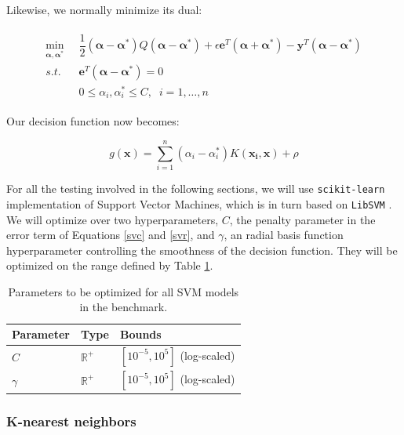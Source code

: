 \documentclass[10pt,a4paper,twoside]{book}
\begin{document}
Likewise, we normally minimize its dual:

\begin{align}\label{svr}
\begin{split}
\min_{\boldsymbol{\alpha}, \boldsymbol{\alpha}^*}\;\;& \dfrac{1}{2}(\boldsymbol{\alpha} - \boldsymbol{\alpha}^*) Q(\boldsymbol{\alpha} - \boldsymbol{\alpha}^*) + \epsilon \boldsymbol{e}^T(\boldsymbol{\alpha} + \boldsymbol{\alpha}^*) - \boldsymbol{y}^T(\boldsymbol{\alpha} - \boldsymbol{\alpha}^*)\\
s.t. \;\; & \boldsymbol{e}^T(\boldsymbol{\alpha} - \boldsymbol{\alpha}^*) = 0\\
\;\; & 0 \leq \alpha_i, \alpha_i^* \leq C, \;\; i=1,\dots,n
\end{split}
\end{align}

Our decision function now becomes:

\begin{equation}
g(\boldsymbol{x}) = \sum_{i=1}^n (\alpha_i - \alpha_i^*) K(\boldsymbol{x_i}, \boldsymbol{x}) + \rho
\end{equation}

For all the testing involved in the following sections, we will use \texttt{scikit-learn} implementation of Support Vector Machines, which is in turn based on \texttt{LibSVM} \cite{Chang2011}. We will optimize over two hyperparameters, $C$, the penalty parameter in the error term of Equations \ref{svc} and \ref{svr}, and $\gamma$, an radial basis function hyperparameter controlling the smoothness of the decision function. They will be optimized on the range defined by Table \ref{svmparam}.


\begin{table}[]
\centering
\caption{Parameters to be optimized for all SVM models in the benchmark.}
\label{svmparam}
\begin{tabular}{@{}lll@{}}
\toprule
\textbf{Parameter} & \textbf{Type}                      & \textbf{Bounds}               \\ \midrule
$C$                & $\mathbb{R}^+$ & $\left[ 10^{-5}, 10^{5} \right]$ (log-scaled) \\
$\gamma$           & $\mathbb{R}^+$ & $\left[10^{-5}, 10^{5} \right]$  (log-scaled)       \\ \bottomrule
\end{tabular}
\end{table}


\subsubsection{K-nearest neighbors}
\end{document}
